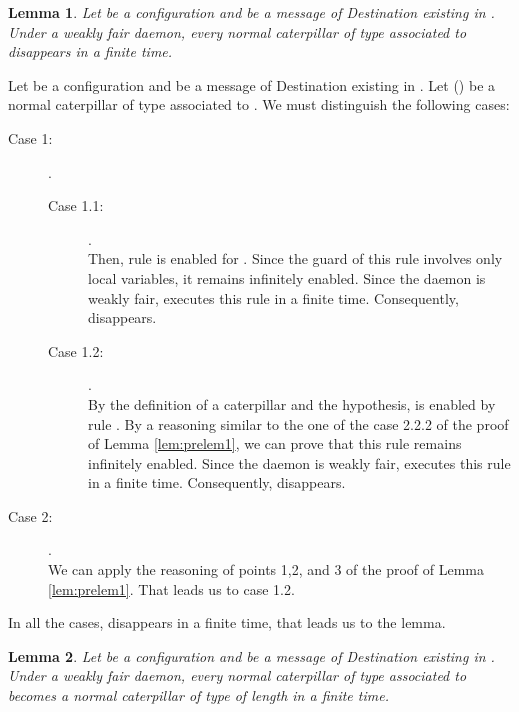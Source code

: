 \documentclass[11pt]{article}
\newtheorem{lemma}{Lemma}
\newenvironment{proof}{{\noindent\bf Proof. } }{{\hfill }}
\begin{document}
\begin{lemma} \label{lem:prelem2}
Let  be a configuration and  be a message of Destination  existing in . Under a weakly fair daemon, every normal caterpillar of type  associated to  disappears in a finite time.
\end{lemma}

\begin{proof}
Let  be a configuration and  be a message of Destination  existing in . Let  () be a normal caterpillar of type  associated to . We must distinguish the following cases:

\begin{description}
\item [Case 1:] .

\begin{description}
\item [Case 1.1:] .\\
Then, rule  is enabled for . Since the guard of this rule involves only local variables, it remains infinitely enabled. Since the daemon is weakly fair,  executes this rule in a finite time. Consequently,  disappears.
\item [Case 1.2:] .\\
By the definition of a caterpillar and the hypothesis,  is enabled by rule . By a reasoning similar to the one of the case 2.2.2 of the proof of Lemma \ref{lem:prelem1}, we can prove that this rule remains infinitely enabled. Since the daemon is weakly fair,  executes this rule in a finite time. Consequently,  disappears.
\end{description}

\item [Case 2:] .\\
We can apply the reasoning of points 1,2, and 3 of the proof of Lemma \ref{lem:prelem1}. That leads us to case 1.2. 
\end{description}

In all the cases,  disappears in a finite time, that leads us to the lemma.
\end{proof}

\begin{lemma} \label{lem:prelem3}
Let  be a configuration and  be a message of Destination  existing in . Under a weakly fair daemon, every normal caterpillar of type  associated to  becomes a normal caterpillar of type  of length  in a finite time.
\end{lemma}
\end{document}

